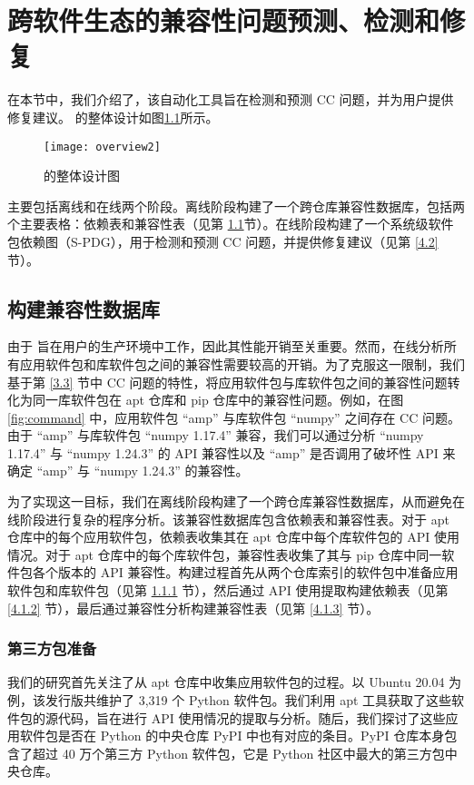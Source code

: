 \chapter{跨软件生态的兼容性问题预测、检测和修复}
在本节中，我们介绍了\tool{}，该自动化工具旨在检测和预测 CC 问题，并为用户提供修复建议。
\tool{}的整体设计如图\ref{fig:overview}所示。
\begin{figure}[htbp] %
	\centering
	\texttt{[image: overview2]}
	\caption{\tool{}的整体设计图}
	\label{fig:overview}
\end{figure}
\tool{}主要包括离线和在线两个阶段。离线阶段构建了一个跨仓库兼容性数据库，包括两个主要表格：依赖表和兼容性表（见第 \ref{4.1}节）。在线阶段构建了一个系统级软件包依赖图（S-PDG），用于检测和预测 CC 问题，并提供修复建议（见第 \ref{4.2} 节）。

\section{构建兼容性数据库}\label{4.1}
由于 \tool{} 旨在用户的生产环境中工作，因此其性能开销至关重要。然而，在线分析所有应用软件包和库软件包之间的兼容性需要较高的开销。为了克服这一限制，我们基于第 \ref{3.3} 节中 CC 问题的特性，将应用软件包与库软件包之间的兼容性问题转化为同一库软件包在 apt 仓库和 pip 仓库中的兼容性问题。例如，在图 \ref{fig:command} 中，应用软件包 “amp” 与库软件包 “numpy” 之间存在 CC 问题。由于 “amp” 与库软件包 “numpy 1.17.4” 兼容，我们可以通过分析 “numpy 1.17.4” 与 “numpy 1.24.3” 的 API 兼容性以及 “amp” 是否调用了破坏性 API 来确定 “amp” 与 “numpy 1.24.3” 的兼容性。

为了实现这一目标，我们在离线阶段构建了一个跨仓库兼容性数据库，从而避免在线阶段进行复杂的程序分析。该兼容性数据库包含依赖表和兼容性表。对于 apt 仓库中的每个应用软件包，依赖表收集其在 apt 仓库中每个库软件包的 API 使用情况。对于 apt 仓库中的每个库软件包，兼容性表收集了其与 pip 仓库中同一软件包各个版本的 API 兼容性。构建过程首先从两个仓库索引的软件包中准备应用软件包和库软件包（见第 \ref{4.1.1} 节），然后通过 API 使用提取构建依赖表（见第 \ref{4.1.2} 节），最后通过兼容性分析构建兼容性表（见第 \ref{4.1.3} 节）。

\subsection{第三方包准备}\label{4.1.1}
我们的研究首先关注了从 apt 仓库中收集应用软件包的过程。以 Ubuntu 20.04 为例，该发行版共维护了 3,319 个 Python 软件包。我们利用 apt 工具获取了这些软件包的源代码，旨在进行 API 使用情况的提取与分析。随后，我们探讨了这些应用软件包是否在 Python 的中央仓库 PyPI  中也有对应的条目。PyPI 仓库本身包含了超过 40 万个第三方 Python 软件包，它是 Python 社区中最大的第三方包中央仓库。


